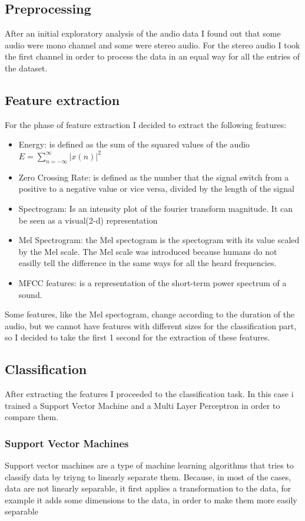 \documentclass[12pt,journal,compsoc]{IEEEtran}
\begin{document}
\subsection{Preprocessing}
After an initial exploratory analysis of the audio data I found out that some audio were mono channel and some were stereo audio. For the stereo audio I took the first channel in order to process the data in an equal way for all the entries of the dataset.
\subsection{Feature extraction}
For the phase of feature extraction I decided to extract the following features:
\begin{itemize}
	\item Energy: is defined as the sum of the squared values of the audio $E = \sum_{n=-\infty}^\infty |x(n)|^2$
	\item Zero Crossing Rate: is defined as the number that the signal switch from a positive to a negative value or vice versa, divided by the length of the signal
	\item Spectrogram: Is an intensity plot of the fourier transform magnitude. It can be seen as a visual(2-d) representation\cite{spectrogram}
	\item Mel Spectrogram: the Mel spectogram is the spectogram with its value scaled by the Mel scale. The Mel scale was introduced because humans do not easilly tell the difference in the same ways for all the heard frequencies.
	\item MFCC features: is a representation of the short-term power spectrum of a sound\cite{MFCC}.
\end{itemize}
Some features, like the Mel spectogram, change according to the duration of the audio, but we cannot have features with different sizes for the classification part, so I decided to take the first 1 second for the extraction of these features.

\subsection{Classification}
After extracting the features I proceeded to the classification task. In this case i trained a Support Vector Machine and a Multi Layer Perceptron in order to compare them.
\subsubsection{Support Vector Machines}
Support vector machines are a type of machine learning algorithms that tries to classify data by triyng to linearly separate them. Because, in most of the cases, data are not linearly separable, it first applies a transformation to the data, for example it adds some dimensions to the data, in order to make them more easily separable
\end{document}
